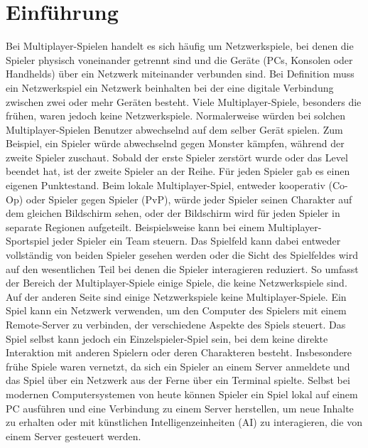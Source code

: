 
\section{Einführung}
Bei Multiplayer-Spielen handelt es sich häufig um Netzwerkspiele, bei denen die Spieler physisch voneinander getrennt sind und die Geräte (PCs, Konsolen oder Handhelds) über ein Netzwerk miteinander verbunden sind. Bei Definition muss ein Netzwerkspiel ein Netzwerk beinhalten bei der eine digitale Verbindung zwischen zwei oder mehr Geräten besteht.\cite{book:multiplayer1}
\newline\noindent\newline
Viele Multiplayer-Spiele, besonders die frühen, waren jedoch keine Netzwerkspiele. Normalerweise würden bei solchen Multiplayer-Spielen Benutzer abwechselnd auf dem selber Gerät spielen. Zum Beispiel, ein Spieler würde abwechselnd gegen Monster kämpfen, während der zweite Spieler zuschaut. Sobald der erste Spieler zerstört wurde oder das Level beendet hat, ist der zweite Spieler an der Reihe. Für jeden Spieler gab es einen eigenen Punktestand.\cite{book:multiplayer1}
\newline\noindent\newline
Beim lokale Multiplayer-Spiel, entweder kooperativ (Co-Op) oder Spieler gegen Spieler (PvP), würde jeder Spieler seinen Charakter auf dem gleichen Bildschirm sehen, oder der Bildschirm wird für jeden Spieler in separate Regionen aufgeteilt. Beispielsweise kann bei einem Multiplayer-Sportspiel jeder Spieler ein Team steuern. Das Spielfeld kann dabei entweder vollständig von beiden Spieler gesehen werden oder die Sicht des Spielfeldes wird auf den wesentlichen Teil bei denen die Spieler interagieren reduziert. So umfasst der Bereich der Multiplayer-Spiele einige Spiele, die keine Netzwerkspiele sind.\cite{book:multiplayer1}
\newline\noindent\newline
Auf der anderen Seite sind einige Netzwerkspiele keine Multiplayer-Spiele. Ein Spiel kann ein Netzwerk verwenden, um den Computer des Spielers mit einem Remote-Server zu verbinden, der verschiedene Aspekte des Spiels steuert. Das Spiel selbst kann jedoch ein Einzelspieler-Spiel sein, bei dem keine direkte Interaktion mit anderen Spielern oder deren Charakteren besteht. Insbesondere frühe Spiele waren vernetzt, da sich ein Spieler an einem Server anmeldete und das Spiel über ein Netzwerk aus der Ferne über ein Terminal spielte. Selbst bei modernen Computersystemen von heute können Spieler ein Spiel lokal auf einem PC ausführen und eine Verbindung zu einem Server herstellen, um neue Inhalte zu erhalten oder mit künstlichen Intelligenzeinheiten (AI) zu interagieren, die von einem Server gesteuert werden.\cite{book:multiplayer1}

